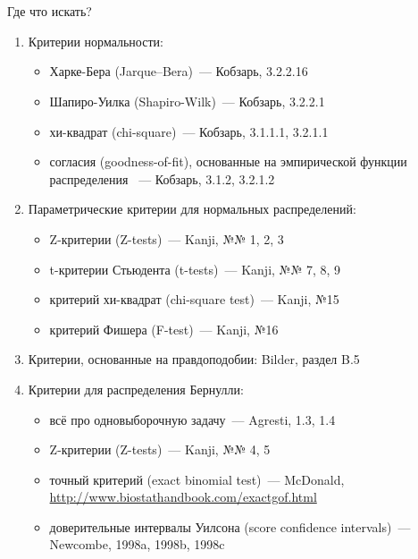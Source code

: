 \documentclass[11pt,pdf,utf8,hyperref={unicode},aspectratio=169]{beamer}
\begin{document}


\section{}

\section{}
\begin{frame}[allowframebreaks]{Где что искать?}
   \begin{enumerate}
        \item Критерии нормальности:
        \begin{itemize}
            \item Харке-Бера (Jarque–Bera)~--- Кобзарь, 3.2.2.16
            \item Шапиро-Уилка (Shapiro-Wilk)~--- Кобзарь, 3.2.2.1
            \item хи-квадрат (chi-square)~--- Кобзарь, 3.1.1.1, 3.2.1.1
            \item согласия (goodness-of-fit), основанные на эмпирической функции распределения ~--- Кобзарь, 3.1.2, 3.2.1.2
        \end{itemize}

        \item Параметрические критерии для нормальных распределений:
        \begin{itemize}
            \item Z-критерии (Z-tests)~--- Kanji, №№ 1, 2, 3
            \item t-критерии Стьюдента (t-tests)~--- Kanji, №№ 7, 8, 9
            \item критерий хи-квадрат (chi-square test)~--- Kanji, №15
            \item критерий Фишера (F-test)~--- Kanji, №16
        \end{itemize}

        \item Критерии, основанные на правдоподобии: Bilder, раздел B.5

        \item Критерии для распределения Бернулли:
        \begin{itemize}
            \item всё про одновыборочную задачу~--- Agresti, 1.3, 1.4
            \item Z-критерии (Z-tests)~--- Kanji, №№ 4, 5
            \item точный критерий (exact binomial test)~--- McDonald, \url{http://www.biostathandbook.com/exactgof.html}
            \item доверительные интервалы Уилсона (score confidence intervals)~--- Newcombe, 1998a, 1998b, 1998c
        \end{itemize}


\end{enumerate}
\end{frame}
\end{document}
